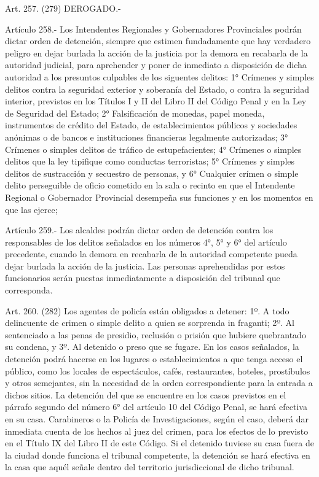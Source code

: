     Art. 257. (279) DEROGADO.-


    Artículo 258.- Los Intendentes Regionales y Gobernadores Provinciales podrán dictar orden de detención, siempre que estimen fundadamente que hay verdadero peligro en dejar burlada la acción de la justicia por la demora en recabarla de la autoridad judicial, para aprehender y poner de inmediato a disposición de dicha autoridad a los presuntos culpables de los siguentes delitos:
    1° Crímenes y simples delitos contra la seguridad exterior y soberanía del Estado, o contra la seguridad interior, previstos en los Títulos I y II del Libro II del Código Penal y en la Ley de Seguridad del Estado;
    2° Falsificación de monedas, papel moneda, instrumentos de crédito del Estado, de establecimientos públicos y sociedades anónimas o de bancos e instituciones financieras legalmente autorizadas;
    3° Crímenes o simples delitos de tráfico de estupefacientes;
    4° Crímenes o simples delitos que la ley tipifique como conductas terroristas;
    5° Crímenes y simples delitos de sustracción y secuestro de personas, y
    6° Cualquier crímen o simple delito perseguible de oficio cometido en la sala o recinto en que el Intendente Regional o Gobernador Provincial desempeña sus funciones y en los momentos en que las ejerce;

    Artículo 259.- Los alcaldes podrán dictar orden de detención contra los responsables de los delitos señalados en los números 4°, 5° y 6° del artículo precedente, cuando la demora en recabarla de la autoridad competente pueda dejar burlada la acción de la justicia.
    Las personas aprehendidas por estos funcionarios serán puestas inmediatamente a disposición del tribunal que corresponda.

    Art. 260. (282) Los agentes de policía están obligados a detener:
    1º. A todo delincuente de crimen o simple delito a quien se sorprenda in fraganti;
    2º. Al sentenciado a las penas de presidio, reclusión o prisión que hubiere quebrantado su condena, y
    3º. Al detenido o preso que se fugare.
    En los casos señalados, la detención podrá hacerse en los lugares o establecimientos a que tenga acceso el público, como los locales de espectáculos, cafés, restaurantes, hoteles, prostíbulos y otros semejantes, sin la necesidad de la orden correspondiente para la entrada a dichos sitios.
    La detención del que se encuentre en los casos previstos en el párrafo segundo del número 6° del artículo 10 del Código Penal, se hará efectiva en su casa. Carabineros o la Policía de Investigaciones, según el caso, deberá dar inmediata cuenta de los hechos al juez del crimen, para los efectos de lo previsto en el Título IX del Libro II de este Código.
    Si el detenido tuviese su casa fuera de la ciudad donde funciona el tribunal competente, la detención se hará efectiva en la casa que aquél señale dentro del territorio jurisdiccional de dicho tribunal.

